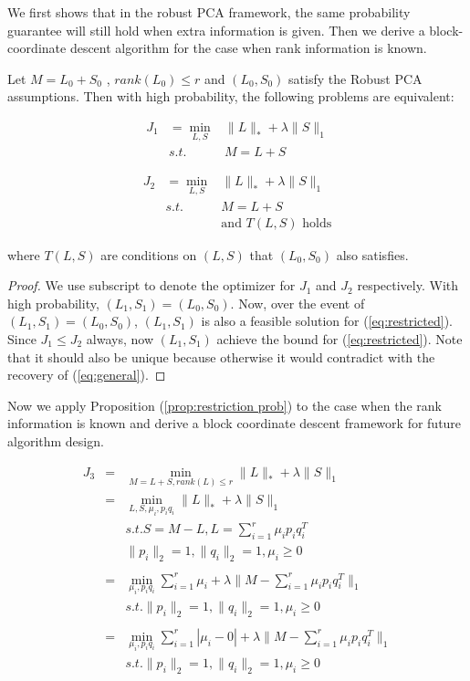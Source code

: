 We first shows that in the robust PCA framework, the same probability
guarantee will still hold when extra information is given. Then we
derive a block-coordinate descent algorithm for the case when rank
information is known.
\begin{prop}
\label{prop:restriction prob}Let $M=L_{0}+S_{0}$ , $rank(L_{0})\le r$ and $(L_0,S_0)$
satisfy the Robust PCA assumptions. Then with high probability, the
following problems are equivalent:

\begin{eqnarray}
J_{1} & =\min_{L,S} & \|L\|_{*}+\lambda\|S\|_{1}\label{eq:general}\\
 & s.t. & M=L+S\nonumber
\end{eqnarray}

\begin{eqnarray}
J_{2} & =\min_{L,S} & \|L\|_{*}+\lambda\|S\|_{1}\label{eq:restricted}\\
 & s.t. & M=L+S\nonumber \\
 &  & \text{and }T(L,S)\text{ holds}\nonumber
\end{eqnarray}


where $T(L,S)$ are conditions on $(L,S)$ that $(L_{0},S_{0})$ also
satisfies.\end{prop}
\begin{proof}
We use subscript to denote the optimizer for $J_{1}$ and $J_{2}$ respectively.
With high probability, $(L_{1},S_{1})=(L_{0},S_{0})$. Now, over the
event of $(L_{1},S_{1})=(L_{0},S_{0})$, $(L_{1},S_{1})$ is also
a feasible solution for (\ref{eq:restricted}). Since $J_{1}\le J_{2}$ always,
now $(L_{1},S_{1})$ achieve the bound for (\ref{eq:restricted}).
Note that it should also be unique because otherwise it would contradict with
the recovery of (\ref{eq:general}).
\end{proof}
Now we apply Proposition (\ref{prop:restriction prob}) to the case
when the rank information is known and derive a block coordinate descent
framework for future algorithm design.

\begin{eqnarray}
J_{3} & = & \min_{M=L+S,rank(L)\le r}\|L\|_{*}+\lambda\|S\|_{1}\nonumber \\
 & = & \min_{L,S,\mu_{i},p_{i}q_{i}}\|L\|_{*}+\lambda\|S\|_{1}\nonumber \\
 && s.t. S=M-L,L=\sum_{i=1}^{r}\mu_{i}p_{i}q_{i}^{T}\nonumber \\
 &  & \|p_{i}\|_{2}=1,\|q_{i}\|_{2}=1,\mu_{i}\ge0\nonumber \\
\nonumber \\
 & = & \min_{\mu_{i},p_{i}q_{i}}\sum_{i=1}^{r}\mu_{i}+\lambda\|M-\sum_{i=1}^{r}\mu_{i}p_{i}q_{i}^{T}\|_{1}\nonumber \\
 && s.t. \|p_{i}\|_{2}=1,\|q_{i}\|_{2}=1,\mu_{i}\ge0\nonumber \\
\nonumber \\
 & = & \min_{\mu_{i},p_{i}q_{i}}\sum_{i=1}^{r}|\mu_{i}-0|+\lambda\|M-\sum_{i=1}^{r}\mu_{i}p_{i}q_{i}^{T}\|_{1}\label{eq:rank form}\\
 && s.t. \|p_{i}\|_{2}=1,\|q_{i}\|_{2}=1,\mu_{i}\ge0\nonumber
\end{eqnarray}


